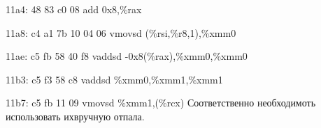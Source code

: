 \documentclass[a4peper, 12pt, titlepage, finall]{extreport}
\begin{document}
    \item {\ttfamily 11a4:	48 83 c0 08          	add    0x8,\%rax}
    \item {\ttfamily 11a8:	c4 a1 7b 10 04 06    	vmovsd (\%rsi,\%r8,1),\%xmm0}
    \item {\ttfamily 11ae:	c5 fb 58 40 f8       	vaddsd -0x8(\%rax),\%xmm0,\%xmm0}
    \item {\ttfamily 11b3:	c5 f3 58 c8          	vaddsd \%xmm0,\%xmm1,\%xmm1}
    \item {\ttfamily 11b7:	c5 fb 11 09          	vmovsd \%xmm1,(\%rcx) }
        Соответственно необходимоть использовать ихвручную отпала.
\end{document}
